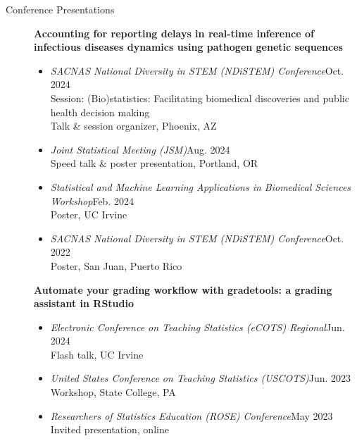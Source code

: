 \documentclass{article}
\begin{document}
	
	\begin{description}
		\vspace{-2mm}
		\item[Conference Presentations]\hspace*{.1in}
		
		\textbf{Accounting for reporting delays in real-time inference of infectious diseases dynamics using pathogen genetic sequences}
		\begin{itemize}
			\item \textit{SACNAS National Diversity in STEM (NDiSTEM) Conference}\hfill{Oct. 2024}\\
			Session: (Bio)statistics: Facilitating biomedical discoveries and public health decision making\\
			Talk \& session organizer, Phoenix, AZ
			
			\item \textit{Joint Statistical Meeting (JSM)}\hfill{Aug. 2024}\\
			Speed talk \& poster presentation, Portland, OR
			
			\item \textit{Statistical and Machine Learning Applications in Biomedical Sciences Workshop}\hfill{Feb. 2024}\\
			Poster, UC Irvine
			
			\item \textit{SACNAS National Diversity in STEM (NDiSTEM) Conference}\hfill{Oct. 2022}\\ 
			Poster, San Juan, Puerto Rico 
		\end{itemize}
		
		\textbf{Automate your grading workflow with gradetools: a grading assistant in RStudio}
		\begin{itemize}
			\item \textit{Electronic Conference on Teaching Statistics (eCOTS) Regional}\hfill{Jun. 2024}\\
			Flash talk, UC Irvine
			
			\item \textit{United States Conference on Teaching Statistics (USCOTS)}\hfill{Jun. 2023}\\
			Workshop, State College, PA
			
			\item \textit{Researchers of Statistics Education (ROSE) Conference}\hfill{May 2023}\\
			Invited presentation, online
		\end{itemize}
		

\end{description}
\end{document}

